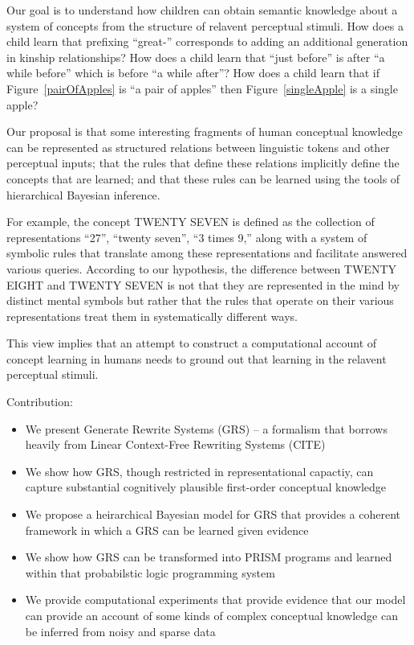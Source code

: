\documentclass{article}
\begin{document}
Our goal is to understand how children can obtain semantic knowledge
about a system of concepts from the structure of relavent perceptual
stimuli. How does a child learn that prefixing ``great-'' corresponds
to adding an additional generation in kinship relationships? How does
a child learn that ``just before'' is after ``a while before'' which
is before ``a while after''? How does a child learn that if
Figure~\ref{pairOfApples} is ``a pair of apples'' then
Figure~\ref{singleApple} is a single apple? 

Our proposal is that some interesting fragments of human conceptual
knowledge can be represented as structured relations between
linguistic tokens and other perceptual inputs; that the rules that
define these relations implicitly define the concepts that are
learned; and that these rules can be learned using the tools of
hierarchical Bayesian inference. 

For example, the concept TWENTY SEVEN is defined as the collection of
representations ``27'', ``twenty seven'', ``3 times 9,'' along with a
system of symbolic rules that translate among these representations
and facilitate answered various queries. According to our hypothesis,
the difference between TWENTY EIGHT and TWENTY SEVEN is not that they
are represented in the mind by distinct mental symbols but rather that
the rules that operate on their various representations treat them in
systematically different ways.

This view implies that an attempt to construct a computational account
of concept learning in humans needs to ground out that learning in the
relavent perceptual stimuli. 

Contribution:
\begin{itemize}
\item We present Generate Rewrite Systems (GRS) -- a formalism that borrows
  heavily from Linear Context-Free Rewriting Systems (CITE)
\item We show how GRS, though restricted in representational capactiy,
  can capture substantial cognitively plausible first-order conceptual knowledge 
\item We propose a heirarchical Bayesian model for GRS that provides a coherent framework in which a GRS can be learned given evidence
\item We show how GRS can be transformed into PRISM programs and learned within that probabilstic logic programming system
\item We provide computational experiments that provide evidence that
  our model can provide an account of some kinds of complex conceptual
  knowledge can be inferred from noisy and sparse data
\end{itemize}
\end{document}
